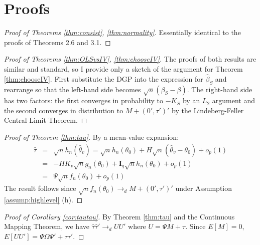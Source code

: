 \section{Proofs}

\begin{proof}[Proof of Theorems \ref{thm:consist}, \ref{thm:normality}]
Essentially identical to the proofs of \cite{NeweyMcFadden1994} Theorems 2.6 and 3.1.
\end{proof}

\begin{proof}[Proof of Theorems \ref{thm:OLSvsIV}, \ref{thm:chooseIV}]
The proofs of both results are similar and standard, so I provide only a sketch of the argument for Theorem \ref{thm:chooseIV}. 
First substitute the DGP into the expression for $\widehat{\beta}_S$ and rearrange so that the left-hand side becomes $\sqrt{n}(\beta_S - \beta)$. 
The right-hand side has two factors: the first converges in probability to $-K_S$ by an $L_2$ argument and the second converges in distribution to $M + (0', \tau')'$ by the Lindeberg-Feller Central Limit Theorem. 
\end{proof}

\begin{proof}[Proof of Theorem \ref{thm:tau}]
By a mean-value expansion:
	\begin{eqnarray*}
	\widehat{\tau} &=& \sqrt{n} h_n\left(\widehat{\theta}_{v}\right) = \sqrt{n}h_n(\theta_0) + H \sqrt{n}\left(\widehat{\theta}_{v} - \theta_0\right) + o_p(1)\\
		&=&-HK_{v} \sqrt{n}g_n(\theta_0) + \mathbf{I}_q\sqrt{n}h_n(\theta_0) +o_p(1)\\
		&=& \Psi \sqrt{n}f_n(\theta_0) + o_p(1) 
\end{eqnarray*}
The result follows since $\sqrt{n}f_n(\theta_0) \rightarrow_d M + (0', \tau')'$ under Assumption \ref{assump:highlevel} (h).
\end{proof}



\begin{proof}[Proof of Corollary \ref{cor:tautau}]
By Theorem \ref{thm:tau} and the Continuous Mapping Theorem, we have $\widehat{\tau}\widehat{\tau}' \rightarrow_d UU'$  where $U =\Psi M + \tau$. Since $E[M]=0$, $E[UU'] = \Psi \Omega \Psi' + \tau\tau'$. 
\end{proof}


